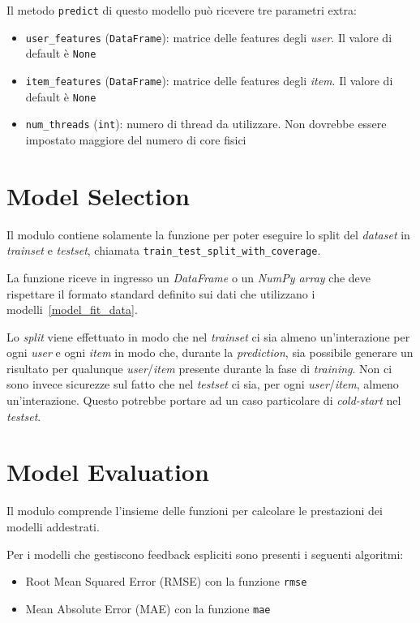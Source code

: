 Il metodo \texttt{predict} di questo modello può ricevere tre parametri extra:

\begin{itemize}
    \item \texttt{user\_features} (\texttt{DataFrame}): matrice delle features degli \textit{user}. Il valore di default è \texttt{None}
    \item \texttt{item\_features} (\texttt{DataFrame}): matrice delle features degli \textit{item}. Il valore di default è \texttt{None}
    \item \texttt{num\_threads} (\texttt{int}): numero di thread da utilizzare. Non dovrebbe essere impostato maggiore del numero di core fisici
\end{itemize}

\section{Model Selection}

Il modulo contiene solamente la funzione per poter eseguire lo split del 
\textit{dataset} in \textit{trainset} e \textit{testset}, chiamata \texttt{train\_test\_split\_with\_coverage}. 

La funzione riceve in ingresso un \textit{DataFrame} o un \textit{NumPy array} che deve rispettare il formato standard definito sui dati che utilizzano i modelli~\ref{model_fit_data}. 

Lo \textit{split} viene effettuato in modo che nel \textit{trainset} ci sia almeno un'interazione per ogni \textit{user} e ogni \textit{item} in modo che, durante la \textit{prediction}, sia possibile generare un risultato per qualunque \textit{user}/\textit{item} presente durante la fase di \textit{training}. Non ci sono invece sicurezze sul fatto che nel \textit{testset} ci sia, per ogni \textit{user}/\textit{item}, almeno un'interazione. Questo potrebbe portare ad un caso particolare di \textit{cold-start} nel \textit{testset}.


\section{Model Evaluation}
Il modulo comprende l'insieme delle funzioni per calcolare le prestazioni dei modelli addestrati.

Per i modelli che gestiscono feedback espliciti sono presenti i seguenti algoritmi:

\begin{itemize}
    \item Root Mean Squared Error (RMSE) con la funzione \texttt{rmse}
    \item Mean Absolute Error (MAE) con la funzione \texttt{mae}
\end{itemize}

